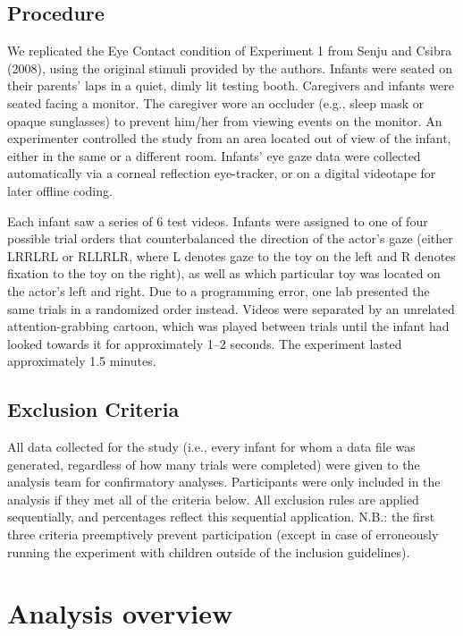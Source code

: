 \documentclass[,man,floatsintext]{apa6}
\begin{document}
\hypertarget{procedure}{%
\subsection{Procedure}\label{procedure}}

We replicated the Eye Contact condition of Experiment 1 from Senju and Csibra (2008), using the original stimuli provided by the authors. Infants were seated on their parents' laps in a quiet, dimly lit testing booth. Caregivers and infants were seated facing a monitor. The caregiver wore an occluder (e.g., sleep mask or opaque sunglasses) to prevent him/her from viewing events on the monitor. An experimenter controlled the study from an area located out of view of the infant, either in the same or a different room. Infants' eye gaze data were collected automatically via a corneal reflection eye-tracker, or on a digital videotape for later offline coding.

Each infant saw a series of 6 test videos. Infants were assigned to one of four possible trial orders that counterbalanced the direction of the actor's gaze (either LRRLRL or RLLRLR, where L denotes gaze to the toy on the left and R denotes fixation to the toy on the right), as well as which particular toy was located on the actor's left and right. Due to a programming error, one lab presented the same trials in a randomized order instead. Videos were separated by an unrelated attention-grabbing cartoon, which was played between trials until the infant had looked towards it for approximately 1--2 seconds. The experiment lasted approximately 1.5 minutes.

\hypertarget{exclusion-criteria}{%
\subsection{Exclusion Criteria}\label{exclusion-criteria}}

All data collected for the study (i.e., every infant for whom a data file was generated, regardless of how many trials were completed) were given to the analysis team for confirmatory analyses. Participants were only included in the analysis if they met all of the criteria below. All exclusion rules are applied sequentially, and percentages reflect this sequential application. N.B.: the first three criteria preemptively prevent participation (except in case of erroneously running the experiment with children outside of the inclusion guidelines).

\hypertarget{analysis-overview}{%
\section{Analysis overview}\label{analysis-overview}}
\end{document}
